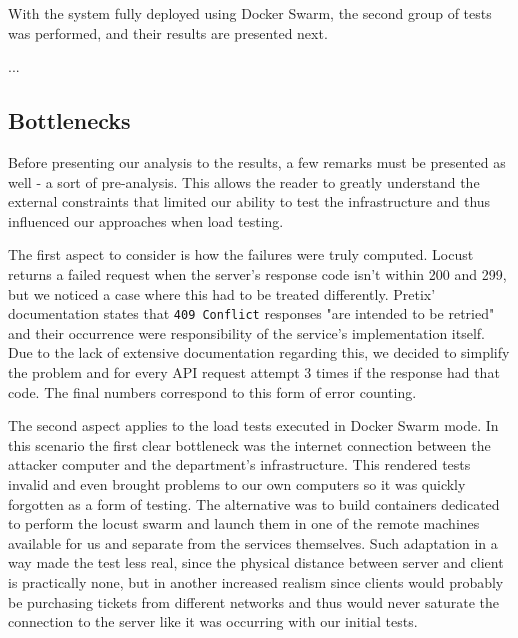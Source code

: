 \documentclass[12pt]{article}
\begin{document}






With the system fully deployed using Docker Swarm, the second group of tests was performed, and their results are presented next.

... 

\subsection{Bottlenecks} \label{performance.bottlenecks} %


Before presenting our analysis to the results, a few remarks must be presented as well - a sort of pre-analysis.
This allows the reader to greatly understand the external constraints that limited our ability to test the infrastructure and thus influenced our approaches 
when load testing.

The first aspect to consider is how the failures were truly computed.
Locust returns a failed request when the server's response code isn't within 200 and 299, but we noticed a case where this had to be treated differently.
Pretix' documentation states that \texttt{409 Conflict} responses "are intended to be retried" and their occurrence were responsibility of the service's 
implementation itself.
Due to the lack of extensive documentation regarding this, we decided to simplify the problem and for every API request attempt 3 times if the response had 
that code.
The final numbers correspond to this form of error counting.

The second aspect applies to the load tests executed in Docker Swarm mode.
In this scenario the first clear bottleneck was the internet connection between the attacker computer and the department's infrastructure.
This rendered tests invalid and even brought problems to our own computers so it was quickly forgotten as a form of testing.
The alternative was to build containers dedicated to perform the locust swarm and launch them in one of the remote machines available for us and separate from 
the services themselves.
Such adaptation in a way made the test less real, since the physical distance between server and client is practically none, but in another increased realism 
since clients would probably be purchasing tickets from different networks and thus would never saturate the connection to the server like it was occurring with 
our initial tests.
\end{document}

